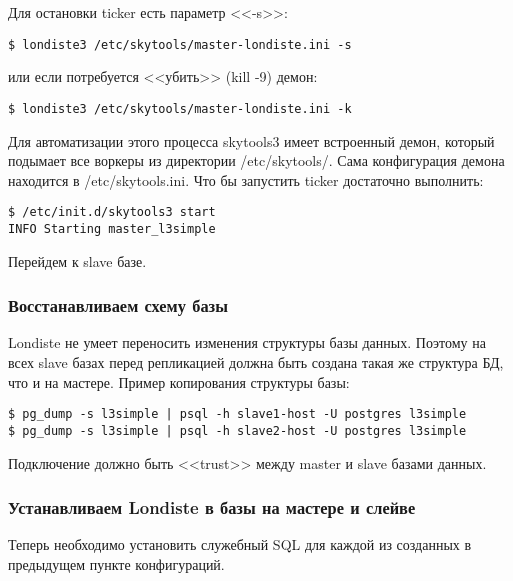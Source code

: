 Для остановки ticker есть параметр <<-s>>:
\begin{lstlisting}[label=lst:londiste-replica5,caption=Остановка ticker]
$ londiste3 /etc/skytools/master-londiste.ini -s
\end{lstlisting}

или если потребуется <<убить>> (kill -9) демон:
\begin{lstlisting}[label=lst:londiste-replica6,caption=Остановка ticker]
$ londiste3 /etc/skytools/master-londiste.ini -k
\end{lstlisting}

Для автоматизации этого процесса skytools3 имеет встроенный демон, который подымает все воркеры из директории /etc/skytools/. Сама конфигурация демона находится в /etc/skytools.ini. Что бы запустить ticker достаточно выполнить:

\begin{lstlisting}[label=lst:londiste-replica7,caption=Демон для ticker]
$ /etc/init.d/skytools3 start
INFO Starting master_l3simple
\end{lstlisting}

Перейдем к slave базе.


\subsubsection{Восстанавливаем схему базы}
Londiste не умеет переносить изменения структуры базы данных.
Поэтому на всех slave базах перед репликацией должна быть создана такая же структура БД, что и на мастере. Пример копирования структуры базы:

\begin{lstlisting}[label=lst:londiste-schema1,caption=Копирования структуры базы]
$ pg_dump -s l3simple | psql -h slave1-host -U postgres l3simple
$ pg_dump -s l3simple | psql -h slave2-host -U postgres l3simple
\end{lstlisting}

Подключение должно быть <<trust>> между master и slave базами данных.












\subsubsection{Устанавливаем Londiste в базы на мастере и слейве}
Теперь необходимо установить служебный SQL для каждой из созданных в предыдущем
пункте конфигураций.

